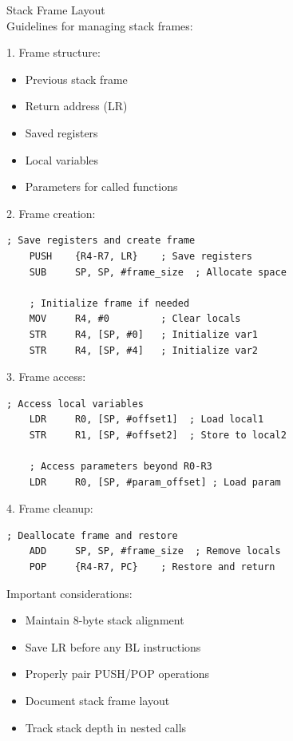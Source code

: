 \begin{KR}{Stack Frame Layout}\\
Guidelines for managing stack frames:

1. Frame structure:
\begin{itemize}
  \item Previous stack frame
  \item Return address (LR)
  \item Saved registers
  \item Local variables
  \item Parameters for called functions
\end{itemize}

2. Frame creation:
\begin{lstlisting}[language=armasm, style=basesmol]
    ; Save registers and create frame
    PUSH    {R4-R7, LR}    ; Save registers
    SUB     SP, SP, #frame_size  ; Allocate space
    
    ; Initialize frame if needed
    MOV     R4, #0         ; Clear locals
    STR     R4, [SP, #0]   ; Initialize var1
    STR     R4, [SP, #4]   ; Initialize var2
\end{lstlisting}

3. Frame access:
\begin{lstlisting}[language=armasm, style=basesmol]
    ; Access local variables
    LDR     R0, [SP, #offset1]  ; Load local1
    STR     R1, [SP, #offset2]  ; Store to local2
    
    ; Access parameters beyond R0-R3
    LDR     R0, [SP, #param_offset] ; Load param
\end{lstlisting}

4. Frame cleanup:
\begin{lstlisting}[language=armasm, style=basesmol]
    ; Deallocate frame and restore
    ADD     SP, SP, #frame_size  ; Remove locals
    POP     {R4-R7, PC}    ; Restore and return
\end{lstlisting}
\end{KR}

\begin{remark}
Important considerations:
\begin{itemize}
  \item Maintain 8-byte stack alignment
  \item Save LR before any BL instructions
  \item Properly pair PUSH/POP operations
  \item Document stack frame layout
  \item Track stack depth in nested calls
\end{itemize}
\end{remark}

